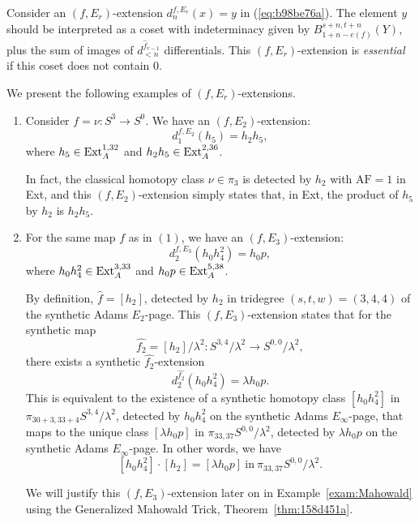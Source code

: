 \documentclass{amsart}
\numberwithin{equation}{section}
\newcommand{\AF}{\mathrm{AF}}
\begin{document}
\begin{remark} \label{def:fErextess}
Consider an $(f,E_r)$-extension $d_{n}^{f,E_r}(x)=y$ in (\ref{eq:b98be76a}).
    The element $y$ should be interpreted as a coset with indeterminacy given by $B_{1+n-e(f)}^{s+n,t+n}(Y)$, plus the sum of images of $d^{\hat f_{r-1}}_{<n}$ differentials.   This $(f,E_r)$-extension is \emph{essential} if this coset does not contain 0.
\end{remark}

\begin{example} \label{exam:extonEn}
We present the following examples of $(f, E_r)$-extensions.
    \begin{enumerate}
        \item Consider $f = \nu: S^3 \rightarrow S^0$. We have an $(f, E_2)$-extension:
        $$d_1^{f, E_2} (h_5) = h_2 h_5,$$
        where $h_5 \in \mathrm{Ext}_A^{1,32}$ and $h_2 h_5 \in \mathrm{Ext}_A^{2,36}$.
        
        In fact, the classical homotopy class $\nu \in \pi_3$ is detected by $h_2$ with $\AF=1$ in Ext, and this $(f, E_2)$-extension simply states that, in Ext, the product of $h_5$ by $h_2$ is $h_2 h_5$.

        \item For the same map $f$ as in $(1)$, we have an $(f, E_3)$-extension:
        $$d_2^{f, E_3} (h_0h_4^2) = h_0 p,$$
        where $h_0 h_4^2 \in \mathrm{Ext}_A^{3,33}$ and $h_0 p \in \mathrm{Ext}_A^{5,38}$.
        
        By definition, $\hat{f} = [h_2]$, detected by $h_2$ in tridegree $(s,t,w) = (3,4,4)$ of the synthetic Adams $E_2$-page. This $(f, E_3)$-extension states that for the synthetic map 
        $$\hat{f_{2}} = [h_2]/\lambda^2: S^{3,4}/\lambda^2 \rightarrow S^{0,0}/\lambda^2,$$ 
        there exists a synthetic $\hat{f_{2}}$-extension
        $$d_2^{\hat{f_{2}}} (h_0h_4^2) = \lambda h_0 p.$$
        This is equivalent to the existence of a synthetic homotopy class $[h_0 h_4^2]$ in $\pi_{30+3, 33+4} S^{3,4}/\lambda^2$, detected by $h_0h_4^2$ on the synthetic Adams $E_\infty$-page, that maps to the unique class $[\lambda h_0 p]$ in $\pi_{33, 37} S^{0,0}/\lambda^2$, detected by $\lambda h_0 p$ on the synthetic Adams $E_\infty$-page. In other words, we have
        $$[h_0 h_4^2] \cdot [h_2] = [\lambda h_0 p] \ \text{in} \ \pi_{33, 37} S^{0,0}/\lambda^2.$$

        We will justify this $(f, E_3)$-extension later on in Example~\ref{exam:Mahowald} using the Generalized Mahowald Trick, Theorem~\ref{thm:158d451a}.


\end{enumerate}
\end{example}
\end{document}
